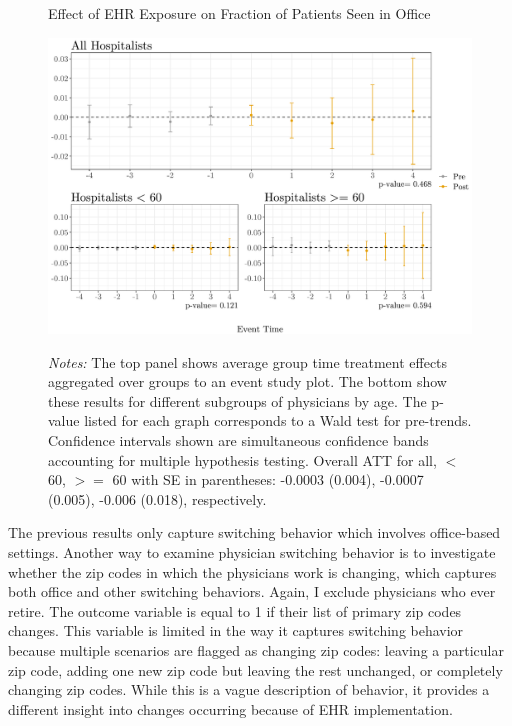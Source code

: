 \documentclass[12pt]{article}
\begin{document}
\begin{figure}[ht]
    \centering
    \captionsetup{width=.85\linewidth}
    \caption{Effect of EHR Exposure on Fraction of Patients Seen in Office}
    \includegraphics[scale=.6]{Objects/officefrac_plot.pdf}
    \label{fig:officesecond}
    \vspace{2mm}
    \caption*{\footnotesize{\textit{Notes:} The top panel shows average group time treatment effects aggregated over groups to an event study plot. The bottom show these results for different subgroups of physicians by age. The p-value listed for each graph corresponds to a Wald test for pre-trends. Confidence intervals shown are simultaneous confidence bands accounting for multiple hypothesis testing. Overall ATT for all, $<$ 60, $>=$ 60 with SE in parentheses: -0.0003 (0.004), -0.0007 (0.005), -0.006 (0.018), respectively.}}
\end{figure}

The previous results only capture switching behavior which involves office-based settings. Another way to examine physician switching behavior is to investigate whether the zip codes in which the physicians work is changing, which captures both office and other switching behaviors. Again, I exclude physicians who ever retire. The outcome variable is equal to 1 if their list of primary zip codes changes. This variable is limited in the way it captures switching behavior because multiple scenarios are flagged as changing zip codes: leaving a particular zip code, adding one new zip code but leaving the rest unchanged, or completely changing zip codes. While this is a vague description of behavior, it provides a different insight into changes occurring because of EHR implementation.
\end{document}
